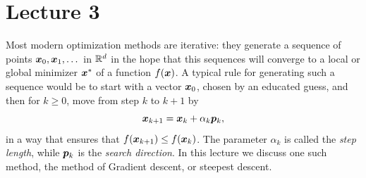 %
%
% 


\chapter*{Lecture 3}
\addtocounter{chapter}{1}
\addtocounter{section}{-2}

Most modern optimization methods are iterative: they generate a sequence of points $\bm{x}_0,\bm{x}_1,\dots$ in $\mathbb{R}^d$
in the hope that this sequences will converge to a local or global minimizer $\bm{x}^*$ of a function $f(\bm{x})$. A typical rule for generating such a sequence would be to start with a vector $\bm{x}_0$, chosen by an educated guess, and then for $k\geq 0$, move from step $k$ to $k+1$ by
\begin{equation*}
 \bm{x}_{k+1} = \bm{x}_k+\alpha_k\bm{p}_k,
\end{equation*}
in a way that ensures that $f(\bm{x}_{k+1})\leq f(\bm{x}_k)$.
The parameter $\alpha_k$ is called the {\em step length}, while $\bm{p}_k$ is the {\em search direction}. In this lecture we discuss one such method, the method of Gradient descent, or steepest descent.

